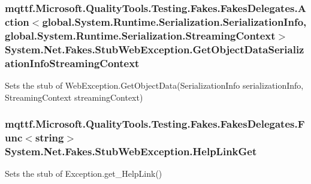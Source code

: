 \hypertarget{class_system_1_1_net_1_1_fakes_1_1_stub_web_exception_a268fec0fb73fc0498c682b75a3d5c9eb}{
\subsubsection[{Get\-Object\-Data\-Serialization\-Info\-Streaming\-Context}]{\setlength{\rightskip}{0pt plus 5cm}mqttf.\-Microsoft.\-Quality\-Tools.\-Testing.\-Fakes.\-Fakes\-Delegates.\-Action$<$global.\-System.\-Runtime.\-Serialization.\-Serialization\-Info, global.\-System.\-Runtime.\-Serialization.\-Streaming\-Context$>$ System.\-Net.\-Fakes.\-Stub\-Web\-Exception.\-Get\-Object\-Data\-Serialization\-Info\-Streaming\-Context}}\label{class_system_1_1_net_1_1_fakes_1_1_stub_web_exception_a268fec0fb73fc0498c682b75a3d5c9eb}


Sets the stub of Web\-Exception.\-Get\-Object\-Data(\-Serialization\-Info serialization\-Info, Streaming\-Context streaming\-Context)

\hypertarget{class_system_1_1_net_1_1_fakes_1_1_stub_web_exception_a3fb41aa1b9850d149540a2e549209e1b}{
\subsubsection[{Help\-Link\-Get}]{\setlength{\rightskip}{0pt plus 5cm}mqttf.\-Microsoft.\-Quality\-Tools.\-Testing.\-Fakes.\-Fakes\-Delegates.\-Func$<$string$>$ System.\-Net.\-Fakes.\-Stub\-Web\-Exception.\-Help\-Link\-Get}}\label{class_system_1_1_net_1_1_fakes_1_1_stub_web_exception_a3fb41aa1b9850d149540a2e549209e1b}


Sets the stub of Exception.\-get\-\_\-\-Help\-Link()

